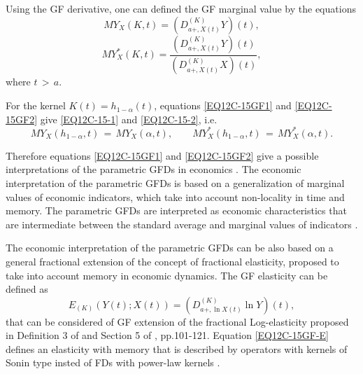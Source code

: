 \documentclass[12pt]{article}
\begin{document}
Using the GF derivative, one can defined the GF marginal value by the equations
\begin{equation} \label{EQ12C-15GF1} 
MY_X(K,t) =
\left(D^{(K)}_{a+,X(t)} Y\right)(t) ,
\end{equation} 
\begin{equation} \label{EQ12C-15GF2} 
MY^{*}_X(K,t) =
\frac{\left(D^{(K)}_{a+,X(t)} Y\right)(t)}{\left(D^{(K)}_{a+,X(t)} X \right)(t)} ,
\end{equation} 
where $t \, > \, a$.

For the kernel $K(t) = h_{1-\alpha}(t)$, equations
\eqref{EQ12C-15GF1} and \eqref{EQ12C-15GF2} give
\eqref{EQ12C-15-1} and \eqref{EQ12C-15-2}, i.e.
\begin{equation} 
MY_X(h_{1-\alpha},t) \, = \, MY_X(\alpha,t) ,
\qquad
MY^{*}_X(h_{1-\alpha},t) \, = \, MY^{*}_X(\alpha,t) .
\end{equation} 


Therefore equations \eqref{EQ12C-15GF1} and \eqref{EQ12C-15GF2} give a possible interpretations of the parametric GFDs in economics \cite{BOOK-DG-2021}.
The economic interpretation of the parametric GFDs is based on a generalization of marginal values of economic indicators, which take into account non-locality in time and memory.
The parametric GFDs are interpreted as economic characteristics that are intermediate between the standard average and marginal values of indicators 
\cite{TT-1,TT-2,Rehman2018,BOOK-DG-2021}.

The economic interpretation of the parametric GFDs can be also based on a general fractional extension of the concept of fractional elasticity, proposed \cite{Elasticity1} to take into account memory in economic dynamics. 
The GF elasticity can be defined as 
\begin{equation} \label{EQ12C-15GF-E} 
E_{{(K)}}(Y(t);X(t)) =
\left(D^{(K)}_{a+, \ln X(t)} \ln Y \right)(t) ,
\end{equation} 
that can be considered of GF extension of the fractional Log-elasticity proposed in Definition 3 of \cite{Elasticity1} and 
Section 5 of \cite{BOOK-DG-2021}, pp.101-121.
Equation \eqref{EQ12C-15GF-E} defines an elasticity with memory that is described by operators with kernels of Sonin type insted of FDs with power-law kernels 
\cite{Elasticity1,BOOK-DG-2021}.


\end{document}
